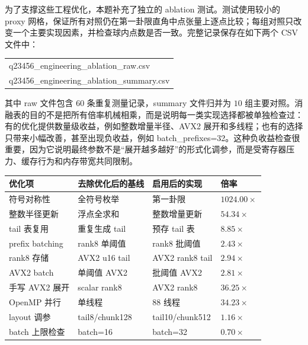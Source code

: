 \documentclass[12pt,a4paper,fontset=none]{ctexart}
\renewcommand{\texttt}[1]{{\ttfamily\footnotesize #1}}
\renewcommand{\texttt}[1]{{\ttfamily #1}}%
\begin{document}
为了支撑这些工程优化，本题补充了独立的 ablation 测试。测试使用较小的 proxy 网格，保证所有对照仍在第一卦限直角中点张量上逐点比较；每组对照只改变一个主要实现因素，并检查球内点数是否一致。完整记录保存在如下两个 CSV 文件中：
\begin{center}
\begin{tabular}{@{}l@{}}
q23456\_engineering\_ablation\_raw.csv\\
q23456\_engineering\_ablation\_summary.csv
\end{tabular}
\end{center}
其中 raw 文件包含 \(60\) 条重复测量记录，summary 文件归并为 \(10\) 组主要对照。消融表的目的不是把所有倍率机械相乘，而是说明每一类实现选择都被单独检查过：有的优化提供数量级收益，例如整数增量半径、AVX2 展开和多线程；也有的选择只带来小幅改善，甚至出现负收益，例如 \texttt{batch\_prefixes}=32。这种负收益检查很重要，因为它说明最终参数不是“展开越多越好”的形式化调参，而是受寄存器压力、缓存行为和内存带宽共同限制。

\begin{table}[H]
  \centering
  \small
  \setlength{\tabcolsep}{2.5pt}
  \begin{tabular}{p{}p{}p{}p{}}
    \toprule
    优化项 & 去除优化后的基线 & 启用后的实现 & 倍率 \\
    \midrule
    符号对称性 & 全符号枚举 & 第一卦限 & \(1024.00\times\) \\
    整数半径更新 & 浮点全求和 & 整数增量更新 & \(54.34\times\) \\
    tail 表复用 & 重复生成 tail & 预存 tail 表 & \(8.85\times\) \\
    prefix batching & rank8 单阈值 & rank8 批阈值 & \(2.43\times\) \\
    rank8 存储 & AVX2 u16 tail & AVX2 rank8 tail & \(2.94\times\) \\
    AVX2 batch & 单阈值 AVX2 & 批阈值 AVX2 & \(2.81\times\) \\
    手写 AVX2 展开 & scalar rank8 & AVX2 rank8 & \(36.25\times\) \\
    OpenMP 并行 & 单线程 & \(88\) 线程 & \(34.23\times\) \\
    layout 调参 & tail8/chunk128 & tail10/chunk512 & \(1.16\times\) \\
    batch 上限检查 & batch=16 & batch=32 & \(0.70\times\) \\
    \bottomrule
  \end{tabular}
\end{table}
\end{document}
